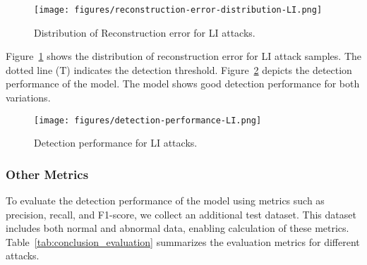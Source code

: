 \begin{figure}[htbp!] 
    \centering 
    \texttt{[image: figures/reconstruction-error-distribution-LI.png]}
    \caption{Distribution of Reconstruction error for LI attacks.}
    \centering
    \label{fig:LI1}
\end{figure}


Figure~\ref{fig:LI1} shows the distribution of reconstruction error for LI attack samples. The dotted line (T) indicates the detection threshold. Figure~\ref{fig:LI2} depicts the detection performance of the model. The model shows good detection performance for both variations. 

\begin{figure}[htbp!] 
    \centering 
    \texttt{[image: figures/detection-performance-LI.png]}
    \caption{Detection performance for LI attacks.}
    \centering
    \label{fig:LI2}
\end{figure}

\iffalse
\begin{figure}[htbp!] 
    \centering 
    \texttt{[image: figures/confusion-matrix-LIx2.png]}
    \caption{Confusion matrix x2}
    \centering
    \label{fig:LI3}
\end{figure}

\begin{figure}[htbp!] 
    \centering 
    \texttt{[image: figures/confusion-matrix-LIx5.png]}
    \caption{Confusion matrix x5}
    \centering
    \label{fig:LI4}
\end{figure}

\fi

\subsubsection{Other Metrics}

To evaluate the detection performance of the model using metrics such as precision, recall, and F1-score, we collect an additional test dataset. This dataset includes both normal and abnormal data, enabling calculation of these metrics. Table~\ref{tab:conclusion_evaluation} summarizes the evaluation metrics for different attacks. 





